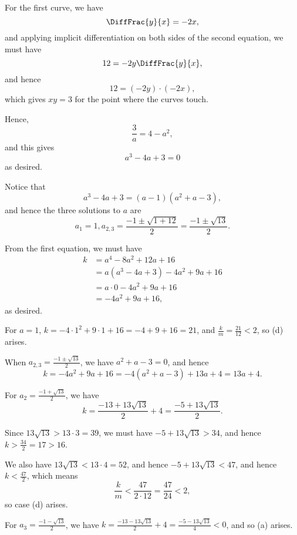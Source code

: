 \begin{enumerate}
          For the first curve, we have
          \[
              \DiffFrac{y}{x} = -2x,
          \]
          and applying implicit differentiation on both sides of the second equation, we must have
          \[
              12 = - 2 y \DiffFrac{y}{x},
          \]
          and hence
          \[
              12 = (-2y) \cdot (-2x),
          \]
          which gives \(xy = 3\) for the point where the curves touch.

          Hence,
          \[
              \frac{3}{a} = 4 - a^2,
          \]
          and this gives
          \[
              a^3 - 4a + 3 = 0
          \]
          as desired.

          Notice that
          \[
              a^3 - 4a + 3 = (a - 1)(a^2 + a - 3),
          \]
          and hence the three solutions to \(a\) are
          \[
              a_1 = 1, a_{2, 3} = \frac{-1 \pm \sqrt{1 + 12}}{2} = \frac{-1 \pm \sqrt{13}}{2}.
          \]

          From the first equation, we must have
          \begin{align*}
              k & = a^4 - 8a^2 + 12a + 16             \\
                & = a (a^3 - 4a + 3) - 4a^2 + 9a + 16 \\
                & = a \cdot 0 - 4a^2 + 9a + 16        \\
                & = -4a^2 + 9a + 16,
          \end{align*}
          as desired.

          For \(a = 1\), \(k = -4 \cdot 1^2 + 9 \cdot 1 + 16 = -4 + 9 + 16 = 21\), and \(\frac{k}{m} = \frac{21}{12} < 2\), so (d) arises.

          When \(a_{2, 3} = \frac{-1 \pm \sqrt{13}}{2}\), we have \(a^2 + a - 3 = 0\), and hence
          \[
              k = -4a^2 + 9a + 16 = -4(a^2 + a - 3) + 13a + 4 = 13a + 4.
          \]

          For \(a_2 = \frac{-1 + \sqrt{13}}{2}\), we have
          \[
              k = \frac{-13 + 13\sqrt{13}}{2} + 4 = \frac{-5 + 13\sqrt{13}}{2}.
          \]

          Since \(13\sqrt{13} > 13 \cdot 3 = 39\), we must have \(-5 + 13\sqrt{13} > 34\), and hence \(k > \frac{34}{2} = 17 > 16\).

          We also have \(13 \sqrt{13} < 13 \cdot 4 = 52\), and hence \(-5 + 13\sqrt{13} < 47\), and hence \(k < \frac{47}{2}\), which means
          \[
              \frac{k}{m} < \frac{47}{2 \cdot 12} = \frac{47}{24} < 2,
          \]
          so case (d) arises.

          For \(a_3 = \frac{-1 - \sqrt{13}}{2}\), we have \(k = \frac{-13 - 13\sqrt{13}}{2} + 4 = \frac{-5 - 13\sqrt{13}}{4} < 0\), and so (a) arises.
\end{enumerate}